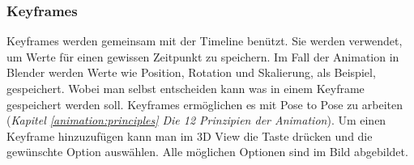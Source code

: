 \subsubsection{Keyframes}
Keyframes werden gemeinsam mit der Timeline benützt. Sie werden verwendet, um Werte für einen gewissen Zeitpunkt zu speichern.
Im Fall der Animation in Blender werden Werte wie Position, Rotation und Skalierung, als Beispiel, gespeichert. Wobei man selbst entscheiden
kann was in einem Keyframe gespeichert werden soll. Keyframes ermöglichen es mit Pose to Pose zu arbeiten (\textit{Kapitel \dq \ref{animation:principles} Die 12 Prinzipien der Animation\dq}).
Um einen Keyframe hinzuzufügen kann man im 3D View die Taste  drücken und die gewünschte Option auswählen. Alle möglichen Optionen sind im Bild abgebildet.

\begin{figure}[H]
    \centering


\end{figure}
